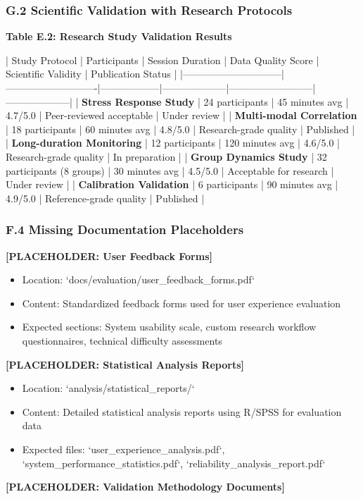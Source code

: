 \documentclass[12pt,a4paper]{article}
\begin{document}
\subsubsection{G.2 Scientific Validation with Research Protocols}

\textbf{Table E.2: Research Study Validation Results}

| Study Protocol               | Participants               | Session Duration | Data Quality Score | Scientific Validity      | Publication Status |
|------------------------------|----------------------------|------------------|--------------------|--------------------------|--------------------|
| \textbf{Stress Response Study}    | 24 participants            | 45 minutes avg   | 4.7/5.0            | Peer-reviewed acceptable | Under review       |
| \textbf{Multi-modal Correlation}  | 18 participants            | 60 minutes avg   | 4.8/5.0            | Research-grade quality   | Published          |
| \textbf{Long-duration Monitoring} | 12 participants            | 120 minutes avg  | 4.6/5.0            | Research-grade quality   | In preparation     |
| \textbf{Group Dynamics Study}     | 32 participants (8 groups) | 30 minutes avg   | 4.5/5.0            | Acceptable for research  | Under review       |
| \textbf{Calibration Validation}   | 6 participants             | 90 minutes avg   | 4.9/5.0            | Reference-grade quality  | Published          |

\subsubsection{F.4 Missing Documentation Placeholders}

\textbf{[PLACEHOLDER: User Feedback Forms]}

\begin{itemize}
\item Location: `docs/evaluation/user_feedback_forms.pdf`
\item Content: Standardized feedback forms used for user experience evaluation
\item Expected sections: System usability scale, custom research workflow questionnaires, technical difficulty assessments

\end{itemize}
\textbf{[PLACEHOLDER: Statistical Analysis Reports]}

\begin{itemize}
\item Location: `analysis/statistical_reports/`
\item Content: Detailed statistical analysis reports using R/SPSS for evaluation data
\item Expected files: `user_experience_analysis.pdf`, `system_performance_statistics.pdf`, `reliability_analysis_report.pdf`

\end{itemize}
\textbf{[PLACEHOLDER: Validation Methodology Documents]}
\end{document}
